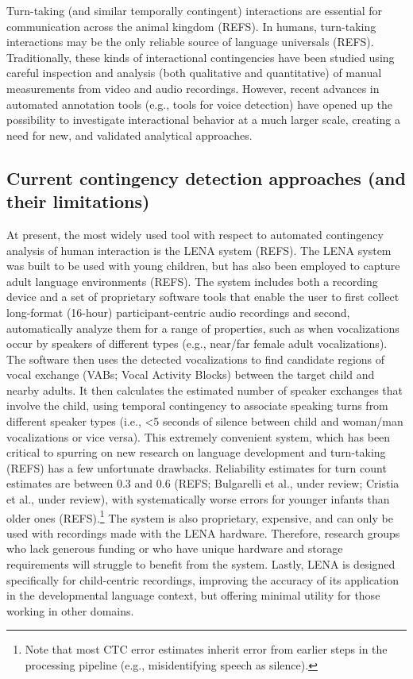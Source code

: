 \documentclass[10pt, letterpaper]{article}
\begin{document}
Turn-taking (and similar temporally contingent) interactions are
essential for communication across the animal kingdom (REFS). In humans,
turn-taking interactions may be the only reliable source of language
universals (REFS). Traditionally, these kinds of interactional
contingencies have been studied using careful inspection and analysis
(both qualitative and quantitative) of manual measurements from video
and audio recordings. However, recent advances in automated annotation
tools (e.g., tools for voice detection) have opened up the possibility
to investigate interactional behavior at a much larger scale, creating a
need for new, and validated analytical approaches.

\hypertarget{current-contingency-detection-approaches-and-their-limitations}{%
\subsection{Current contingency detection approaches (and their
limitations)}\label{current-contingency-detection-approaches-and-their-limitations}}

At present, the most widely used tool with respect to automated
contingency analysis of human interaction is the LENA system (REFS). The
LENA system was built to be used with young children, but has also been
employed to capture adult language environments (REFS). The system
includes both a recording device and a set of proprietary software tools
that enable the user to first collect long-format (16-hour)
participant-centric audio recordings and second, automatically analyze
them for a range of properties, such as when vocalizations occur by
speakers of different types (e.g., near/far female adult vocalizations).
The software then uses the detected vocalizations to find candidate
regions of vocal exchange (VABs; Vocal Activity Blocks) between the
target child and nearby adults. It then calculates the estimated number
of speaker exchanges that involve the child, using temporal contingency
to associate speaking turns from different speaker types (i.e.,
\textless5 seconds of silence between child and woman/man vocalizations
or vice versa). This extremely convenient system, which has been
critical to spurring on new research on language development and
turn-taking (REFS) has a few unfortunate drawbacks. Reliability
estimates for turn count estimates are between 0.3 and 0.6 (REFS;
Bulgarelli et al., under review; Cristia et al., under review), with
systematically worse errors for younger infants than older ones
(REFS).\footnote{Note that most CTC error estimates inherit error from
  earlier steps in the processing pipeline (e.g., misidentifying speech
  as silence).} The system is also proprietary, expensive, and can only
be used with recordings made with the LENA hardware. Therefore, research
groups who lack generous funding or who have unique hardware and storage
requirements will struggle to benefit from the system. Lastly, LENA is
designed specifically for child-centric recordings, improving the
accuracy of its application in the developmental language context, but
offering minimal utility for those working in other domains.
\end{document}
